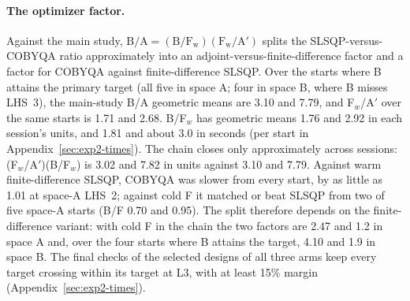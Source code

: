 \paragraph{The optimizer factor.}
Against the main study, $\mathrm{B/A}=(\mathrm{B/F_w})(\mathrm{F_w/A'})$
splits the SLSQP-versus-COBYQA ratio approximately into an
adjoint-versus-finite-difference factor and a factor for COBYQA against
finite-difference SLSQP. Over the starts where B attains the primary target
(all five in space A; four in space B, where B misses LHS~3), the main-study
B/A geometric means are 3.10 and 7.79, and F$_w$/A$'$ over the same starts
is 1.71 and 2.68. B/F$_w$ has geometric means
1.76 and 2.92 in each session's units, and 1.81 and about 3.0 in seconds
(per start in Appendix~\ref{sec:exp2-times}). The chain
closes only approximately across sessions: (F$_w$/A$'$)(B/F$_w$) is 3.02
and 7.82 in units against 3.10 and 7.79. Against warm finite-difference
SLSQP, COBYQA was slower from every start, by as little as 1.01 at
space-A LHS~2; against cold F it matched or beat SLSQP from two of five
space-A starts (B/F 0.70 and 0.95). The split therefore depends on the
finite-difference variant: with cold F in the chain the two factors are
2.47 and 1.2 in space A and, over the four starts where B attains the
target, 4.10 and 1.9 in space B. The final checks of the selected
designs of all three arms keep every target crossing within its target at
L3, with at least 15\% margin (Appendix~\ref{sec:exp2-times}).
